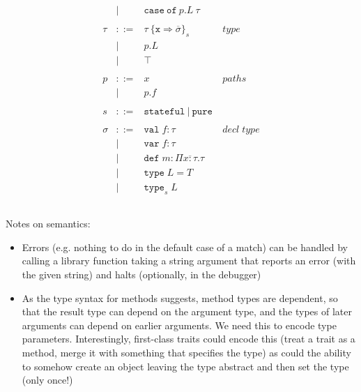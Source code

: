 \documentclass{article}
\newcommand{\keywadj}[1]{\mathtt{#1}}
\newcommand{\keyw}[1]{\keywadj{#1}~}
\begin{document}
\[\begin{array}{lll}
\begin{array}{lllr}
& | & \keyw{case} \keyw{of} p.L~\tau &\\
&&\\
\tau & ::= & \tau~\{\texttt{x} \Rightarrow \overline{\sigma}\}_{s} & type \\
& | & p.L &\\
& | & \top &\\
&&\\
p & ::= & x & paths \\
& | & p.f &\\
&&\\
s & ::= & \keyw{stateful} | ~\keyw{pure} \\
&&\\
\sigma & ::= & \texttt{val} \; f:\tau & decl \; type\\
       & |   & \texttt{var} \; f:\tau \\
       & |   & \texttt{def} \; m:\Pi \overline{x{:}\tau} . \tau \\
       & |   & \texttt{type} \; L = T &\\
       & |   & \texttt{type}_{s} \; L &\\
&&\\
\end{array}
\end{array}
\]

Notes on semantics:

\begin{itemize}


\item Errors (e.g. nothing to do in the default case of a match) can be handled by calling a library function taking a string argument that reports an error (with the given string) and halts (optionally, in the debugger)


\item As the type syntax for methods suggests, method types are dependent, so that the result type can depend on the argument type, and the types of later arguments can depend on earlier arguments.  We need this to encode type parameters.  Interestingly, first-class traits could encode this (treat a trait as a method, merge it with something that specifies the type) as could the ability to somehow create an object leaving the type abstract and then set the type (only once!)

\end{itemize}
\end{document}
